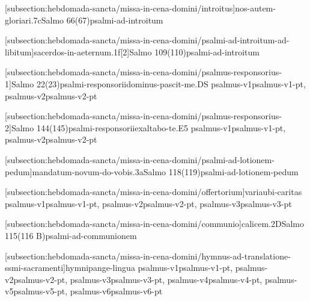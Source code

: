 \def\Prefix{subsection:hebdomada-sancta/missa-in-cena-domini}
[\Prefix/introitus]{nos-autem-gloriari.7c}{Salmo 66(67)}{psalmi-ad-introitum}

\AllowPageFlush

[\Prefix/psalmi-ad-introitum-ad-libitum]{sacerdos-in-aeternum.1f}[2]{Salmo 109(110)}{psalmi-ad-introitum}

\AllowPageFlush

[\Prefix/psalmus-responsorius-1]{Salmo 22(23)}{psalmi-responsorii}{dominus-pascit-me.DS}{
  {psalmus-v1}{psalmus-v1-pt},
  {psalmus-v2}{psalmus-v2-pt}
}

\AllowPageFlush

[\Prefix/psalmus-responsorius-2]{Salmo 144(145)}{psalmi-responsorii}{exaltabo-te.E5}{
  {psalmus-v1}{psalmus-v1-pt},
  {psalmus-v2}{psalmus-v2-pt}
}

\AllowPageFlush

[\Prefix/psalmi-ad-lotionem-pedum]{mandatum-novum-do-vobis.3a}{Salmo 118(119)}{psalmi-ad-lotionem-pedum}

[\Prefix/offertorium]{}{varia}{ubi-caritas}{
  {psalmus-v1}{psalmus-v1-pt},
  {psalmus-v2}{psalmus-v2-pt},
  {psalmus-v3}{psalmus-v3-pt}
}

\AllowPageFlush

[\Prefix/communio]{calicem.2D}{Salmo 115(116 B)}{psalmi-ad-communionem}

\AllowPageFlush

[\Prefix/hymnus-ad-translatione-ssmi-sacramenti]{hymni}{pange-lingua}{
  {psalmus-v1}{psalmus-v1-pt},
  {psalmus-v2}{psalmus-v2-pt},
  {psalmus-v3}{psalmus-v3-pt},
  {psalmus-v4}{psalmus-v4-pt},
  {psalmus-v5}{psalmus-v5-pt},
  {psalmus-v6}{psalmus-v6-pt}
}

\AllowPageBreak